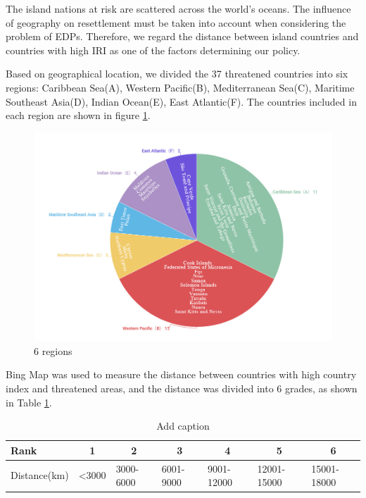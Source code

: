 \documentclass[12pt]{article}  %
\begin{document}
The island nations at risk are scattered across the world's oceans. The influence of geography on resettlement must be taken into account when considering the problem of EDPs. Therefore, we regard the distance between island countries and countries with high IRI as one of the factors determining our policy.


Based on geographical location, we divided the 37 threatened countries into six regions: Caribbean Sea(A), Western Pacific(B), Mediterranean Sea(C), Maritime Southeast Asia(D), Indian Ocean(E), East Atlantic(F). The countries included in each region are shown in figure \ref{6_regions}.


\begin{figure}[htbp]
	\centering
	\includegraphics[width=.8\textwidth]{6_regions.png}
	\caption{ 6 regions}\label{6_regions}
\end{figure}




Bing Map was used to measure the distance between countries with high country index and threatened areas, and the distance was divided into 6 grades, as shown in Table \ref{distance_level}.



\begin{table}[htbp]
  \centering
  \caption{Add caption}
    \begin{tabular}{lllllll}
    \toprule
    Rank  & \multicolumn{1}{c}{1} & \multicolumn{1}{c}{2} & \multicolumn{1}{c}{3} & \multicolumn{1}{c}{4} & \multicolumn{1}{c}{5} & \multicolumn{1}{c}{6} \\
    \midrule
    Distance(km) & <3000 & 3000-6000 & 6001-9000 & 9001-12000 & 12001-15000 & 15001-18000 \\
    \bottomrule
    \end{tabular}%
  \label{distance_level}%
\end{table}%
\end{document}
